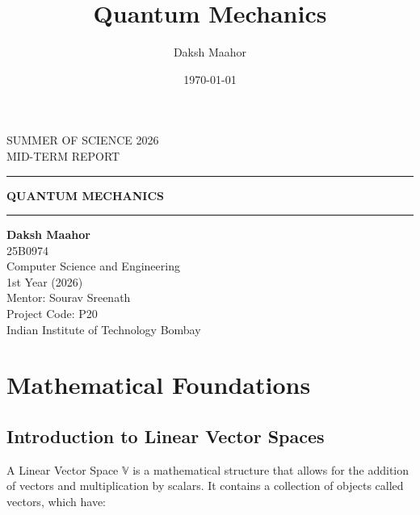 \documentclass[12pt,a4paper]{report}
\title{Quantum Mechanics}
\author{Daksh Maahor}
\date{\today}
\newcommand{\vecspace}[1]{\mathbb{#1}}
\begin{document}
\begin{titlepage}
\centering

\vspace*{2cm}

{\Large SUMMER OF SCIENCE 2026\\[0.2cm]
MID-TERM REPORT}

\vspace{1.5cm}
\rule{0.8\textwidth}{0.5pt}

\vspace{1cm}

{\Huge\bfseries QUANTUM MECHANICS}

\vspace{1cm}

\rule{0.8\textwidth}{0.5pt}

\vfill

{\Large
\textbf{Daksh Maahor}\\
25B0974\\
Computer Science and Engineering\\
1st Year (2026)\\
Mentor: Sourav Sreenath\\
Project Code: P20\\
Indian Institute of Technology Bombay\\
}

\vfill

\end{titlepage}

\tableofcontents
\clearpage


\chapter{Mathematical Foundations}

\section{Introduction to Linear Vector Spaces}

A Linear Vector Space $\vecspace{V}$ is a mathematical structure that allows for the addition of vectors and multiplication by scalars. It contains a collection of objects called vectors, which have:
\end{document}
